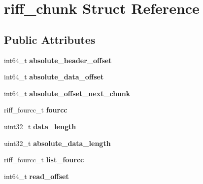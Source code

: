 \hypertarget{structriff__chunk}{\section{riff\-\_\-chunk Struct Reference}
\label{structriff__chunk}
}
\subsection*{Public Attributes}
\begin{DoxyCompactItemize}
\item 
\hypertarget{structriff__chunk_a9672c9b38c22656f73de7901defb6616}{int64\-\_\-t {\bfseries absolute\-\_\-header\-\_\-offset}}\label{structriff__chunk_a9672c9b38c22656f73de7901defb6616}

\item 
\hypertarget{structriff__chunk_a3802a1256349aeec179dce24954824ae}{int64\-\_\-t {\bfseries absolute\-\_\-data\-\_\-offset}}\label{structriff__chunk_a3802a1256349aeec179dce24954824ae}

\item 
\hypertarget{structriff__chunk_abe0cef88abf3dbd02ba3311023655c64}{int64\-\_\-t {\bfseries absolute\-\_\-offset\-\_\-next\-\_\-chunk}}\label{structriff__chunk_abe0cef88abf3dbd02ba3311023655c64}

\item 
\hypertarget{structriff__chunk_add227a7f6ae472ad518b8bf7d7bab5ad}{riff\-\_\-fourcc\-\_\-t {\bfseries fourcc}}\label{structriff__chunk_add227a7f6ae472ad518b8bf7d7bab5ad}

\item 
\hypertarget{structriff__chunk_ae8a674065a5c0233397c51e0a713035a}{uint32\-\_\-t {\bfseries data\-\_\-length}}\label{structriff__chunk_ae8a674065a5c0233397c51e0a713035a}

\item 
\hypertarget{structriff__chunk_acaacdd6a95a715f0091f3833d0423c2b}{uint32\-\_\-t {\bfseries absolute\-\_\-data\-\_\-length}}\label{structriff__chunk_acaacdd6a95a715f0091f3833d0423c2b}

\item 
\hypertarget{structriff__chunk_a180f70c9681bf0eab690e5ddb665645b}{riff\-\_\-fourcc\-\_\-t {\bfseries list\-\_\-fourcc}}\label{structriff__chunk_a180f70c9681bf0eab690e5ddb665645b}

\item 
\hypertarget{structriff__chunk_a4da2e927daa313439cc40bf4417237c8}{int64\-\_\-t {\bfseries read\-\_\-offset}}\label{structriff__chunk_a4da2e927daa313439cc40bf4417237c8}


\end{DoxyCompactItemize}
